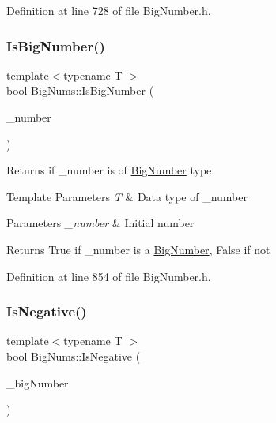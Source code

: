Definition at line 728 of file Big\+Number.\+h.

\mbox{\label{namespace_big_nums_a66d44277d6d6e0ff43c9e00ee79e0c86}} 
\subsubsection{\texorpdfstring{IsBigNumber()}{IsBigNumber()}}
{\footnotesize\ttfamily template$<$typename T $>$ \\
bool Big\+Nums\+::\+Is\+Big\+Number (\begin{DoxyParamCaption}\item[{const T \&}]{\+\_\+number }\end{DoxyParamCaption})}

Returns if \+\_\+number is of \mbox{\hyperlink{class_big_nums_1_1_big_number}{Big\+Number}} type 
\begin{DoxyTemplParams}{Template Parameters}
{\em T} & Data type of \+\_\+number \\
\hline
\end{DoxyTemplParams}

\begin{DoxyParams}{Parameters}
{\em \+\_\+number} & Initial number \\
\hline
\end{DoxyParams}
\begin{DoxyReturn}{Returns}
True if \+\_\+number is a \mbox{\hyperlink{class_big_nums_1_1_big_number}{Big\+Number}}, False if not 
\end{DoxyReturn}


Definition at line 854 of file Big\+Number.\+h.

\mbox{\label{namespace_big_nums_aea836101e2c13e62da1ac27d7b6c77d8}} 
\subsubsection{\texorpdfstring{IsNegative()}{IsNegative()}}
{\footnotesize\ttfamily template$<$typename T $>$ \\
bool Big\+Nums\+::\+Is\+Negative (\begin{DoxyParamCaption}\item[{const T \&}]{\+\_\+big\+Number }\end{DoxyParamCaption})}

